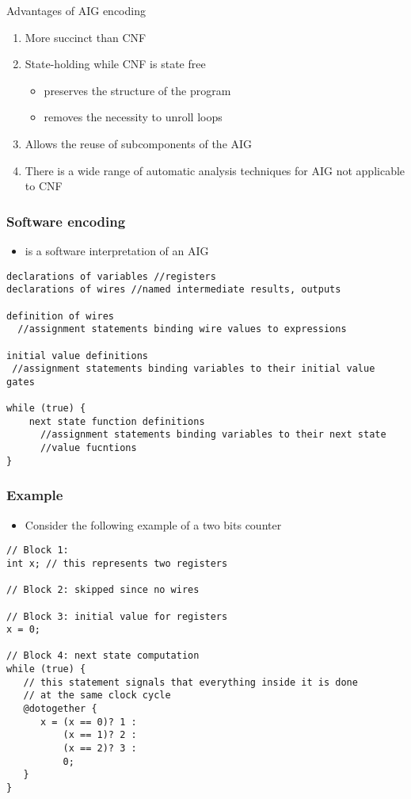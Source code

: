 \begin{frame}{Advantages of AIG encoding}
\begin{enumerate}
  \item More succinct than CNF
  \item State-holding while CNF is state free
  \begin{itemize}
   \item preserves the structure of the program
   \item removes the necessity to unroll loops
  \end{itemize}
  \item Allows the reuse of subcomponents of the AIG 
  \item There is a wide range of automatic analysis techniques for AIG not applicable to CNF
 \end{enumerate}
\end{frame}

\begin{frame}[containsverbatim]
\frametitle{Software encoding}
\begin{itemize}
 \item \thislanguage{} is a software interpretation of an AIG
\end{itemize}
\begin{Verbatim}[frame=single,fontsize=\relsize{-2.5}]
declarations of variables //registers
declarations of wires //named intermediate results, outputs

definition of wires 
  //assignment statements binding wire values to expressions

initial value definitions 
 //assignment statements binding variables to their initial value gates

while (true) {
    next state function definitions 
      //assignment statements binding variables to their next state 
      //value fucntions
}
\end{Verbatim}
\end{frame}

\begin{frame}[containsverbatim]
\frametitle{Example}
\begin{itemize}
 \item Consider the following example of a two bits counter
\end{itemize}
\begin{Verbatim}[frame=single,fontsize=\relsize{-2.5}]
// Block 1:
int x; // this represents two registers

// Block 2: skipped since no wires

// Block 3: initial value for registers
x = 0; 

// Block 4: next state computation 
while (true) {
   // this statement signals that everything inside it is done
   // at the same clock cycle
   @dotogether {
      x = (x == 0)? 1 :
          (x == 1)? 2 :
          (x == 2)? 3 :
          0;
   }
}
\end{Verbatim}
\end{frame}
